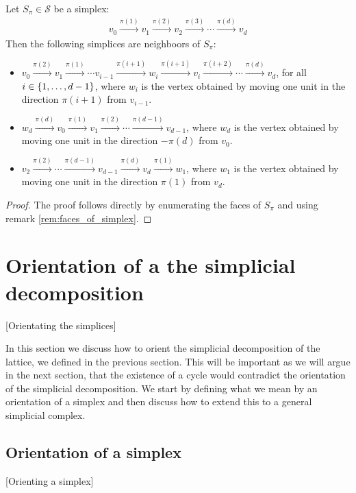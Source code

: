 \begin{lemma}
	Let $S_{\pi} \in \mathcal{S}$ be a simplex:
	\begin{align*}
		v_0 \xrightarrow{\pi(1)} v_1 \xrightarrow{\pi(2)} v_2 \xrightarrow{\pi(3)} \cdots \xrightarrow{\pi(d)} v_d
	\end{align*}
	Then the following simplices are neighboors of $S_{\pi}$:
	\begin{itemize}
		\item $v_0 \xrightarrow{\pi(2)} v_1 \xrightarrow{\pi(1)} \cdots v_{i-1} \xrightarrow{\pi(i+1)} w_i \xrightarrow{\pi(i+1)} v_{i} \xrightarrow{\pi(i+2)} \cdots \xrightarrow{\pi(d)} v_d$, for all $i \in \left\{1, \dots, d-1\right\}$, where $w_i$ is the vertex obtained by moving one unit in the direction $\pi(i+1)$ from $v_{i-1}$.
		\item $w_d \xrightarrow{\pi(d)} v_0 \xrightarrow{\pi(1)} v_1 \xrightarrow{\pi(2)} \cdots \xrightarrow{\pi(d-1)} v_{d-1}$, where $w_d$ is the vertex obtained by moving one unit in the direction $-\pi(d)$ from $v_{0}$.
		\item $v_2 \xrightarrow{\pi(2)} \cdots \xrightarrow{\pi(d-1)} v_{d-1} \xrightarrow{\pi(d)} v_d \xrightarrow{\pi(1)} w_1$, where $w_1$ is the vertex obtained by moving one unit in the direction $\pi(1)$ from $v_d$.
	\end{itemize}
\end{lemma}
\begin{proof}
	The proof follows directly by enumerating the faces of $S_{\pi}$ and using remark \ref{rem:faces_of_simplex}.
\end{proof}

\section{Orientation of a the simplicial decomposition}[Orientating the simplices]

In this section we discuss how to orient the simplicial decomposition of the lattice, we defined in the previous section. This will be important as we will argue in the next section, that the existence of a cycle would contradict the orientation of the simplicial decomposition. We start by defining what we mean by an orientation of a simplex and then discuss how to extend this to a general simplicial complex.

\subsection{Orientation of a simplex}[Orienting a simplex]
\label{sec:orientation_of_simplex}

